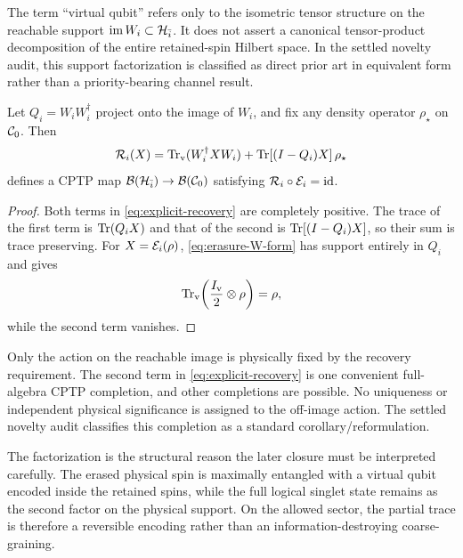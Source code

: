 The term ``virtual qubit'' refers only to the isometric tensor structure on the reachable support $\operatorname{im}W_i\subset\mathcal H_{\bar i}$.  It does not assert a canonical tensor-product decomposition of the entire retained-spin Hilbert space.  In the settled novelty audit, this support factorization is classified as direct prior art in equivalent form rather than a priority-bearing channel result.

\begin{corollary}
\label{cor:explicit-recovery}
Let $Q_i=W_iW_i^\dagger$ project onto the image of $W_i$, and fix any density operator $\rho_\star$ on $\mathcal C_0$.  Then
\begin{equation}
  \mathcal R_i(X)
  =\operatorname{Tr}_{\mathrm v}(W_i^\dagger XW_i)
   +\operatorname{Tr}[(I-Q_i)X]\,\rho_\star
  \label{eq:explicit-recovery}
\end{equation}
defines a CPTP map $\mathcal B(\mathcal H_{\bar i})\to\mathcal B(\mathcal C_0)$ satisfying $\mathcal R_i\circ\mathcal E_i=\operatorname{id}$.
\end{corollary}

\begin{proof}
Both terms in \cref{eq:explicit-recovery} are completely positive.  The trace of the first term is $\operatorname{Tr}(Q_iX)$ and that of the second is $\operatorname{Tr}[(I-Q_i)X]$, so their sum is trace preserving.  For $X=\mathcal E_i(\rho)$, \cref{eq:erasure-W-form} has support entirely in $Q_i$ and gives
\begin{equation}
  \operatorname{Tr}_{\mathrm v}\!\left(\frac{I_{\mathrm v}}2\otimes\rho\right)=\rho,
\end{equation}
while the second term vanishes.
\end{proof}

Only the action on the reachable image is physically fixed by the recovery requirement.  The second term in \cref{eq:explicit-recovery} is one convenient full-algebra CPTP completion, and other completions are possible.  No uniqueness or independent physical significance is assigned to the off-image action.  The settled novelty audit classifies this completion as a standard corollary/reformulation.

The factorization is the structural reason the later closure must be interpreted carefully.  The erased physical spin is maximally entangled with a virtual qubit encoded inside the retained spins, while the full logical singlet state remains as the second factor on the physical support.  On the allowed sector, the partial trace is therefore a reversible encoding rather than an information-destroying coarse-graining.
